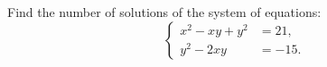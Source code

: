 Find the number of solutions of the system of equations: \[\left\{\begin{aligned} x^{2}-xy+y^{2} &=21, \\ y^{2}-2xy &=-15. \end{aligned}\right.\]
